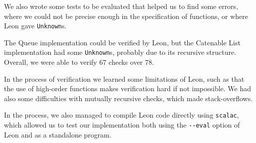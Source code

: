 We also wrote some tests to be evaluated that helped us to find some errors,
where we could not be precise enough in the specification of functions,
or where Leon gave \verb|Unknown|s.

The Queue implementation could be verified by Leon,
but the Catenable List implementation had some \verb|Unknown|s,
probably due to its recursive structure. Overall, we were able to verify 67 checks over 78.

In the process of verification we learned some limitations of Leon,
such as that the use of high-order functions makes verification hard if not impossible.
We had also some difficulties with mutually recursive checks, 
which made stack-overflows.

In the process, we also managed to compile Leon code directly using \verb|scalac|, 
which allowed us to test our implementation both using the \verb|--eval| option of
Leon and as a standalone program.